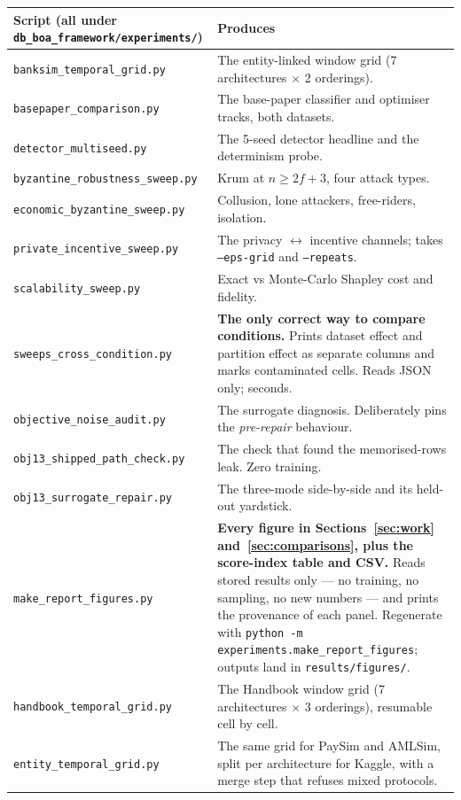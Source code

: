 \documentclass[11pt]{article}
\begin{document}
\begin{center}\small
\begin{tabularx}{\linewidth}{@{}p{5.2cm} X@{}}
\toprule
\textbf{Script} (all under \texttt{db\_boa\_framework/experiments/}) & \textbf{Produces} \\
\midrule
\texttt{banksim\_temporal\_grid.py} & The entity-linked window grid (7 architectures $\times$ 2 orderings). \\
\texttt{basepaper\_comparison.py} & The base-paper classifier and optimiser tracks, both datasets. \\
\texttt{detector\_multiseed.py} & The 5-seed detector headline and the determinism probe. \\
\texttt{byzantine\_robustness\_sweep.py} & Krum at $n\ge2f+3$, four attack types. \\
\texttt{economic\_byzantine\_sweep.py} & Collusion, lone attackers, free-riders, isolation. \\
\texttt{private\_incentive\_sweep.py} & The privacy $\leftrightarrow$ incentive channels; takes \texttt{--eps-grid} and \texttt{--repeats}. \\
\texttt{scalability\_sweep.py} & Exact vs Monte-Carlo Shapley cost and fidelity. \\
\texttt{sweeps\_cross\_condition.py} & \textbf{The only correct way to compare conditions.} Prints dataset effect and partition effect as separate columns and marks contaminated cells. Reads JSON only; seconds. \\
\texttt{objective\_noise\_audit.py} & The surrogate diagnosis. Deliberately pins the \emph{pre-repair} behaviour. \\
\texttt{obj13\_shipped\_path\_check.py} & The check that found the memorised-rows leak. Zero training. \\
\texttt{obj13\_surrogate\_repair.py} & The three-mode side-by-side and its held-out yardstick. \\
\texttt{make\_report\_figures.py} & \textbf{Every figure in Sections~\ref{sec:work} and~\ref{sec:comparisons}, plus the score-index table and CSV.} Reads stored results only --- no training, no sampling, no new numbers --- and prints the provenance of each panel. Regenerate with \texttt{python -m experiments.make\_report\_figures}; outputs land in \texttt{results/figures/}. \\
\texttt{handbook\_temporal\_grid.py} & The Handbook window grid (7 architectures $\times$ 3 orderings), resumable cell by cell. \\
\texttt{entity\_temporal\_grid.py} & The same grid for PaySim and AMLSim, split per architecture for Kaggle, with a merge step that refuses mixed protocols. \\

\end{tabularx}
\end{center}
\end{document}
